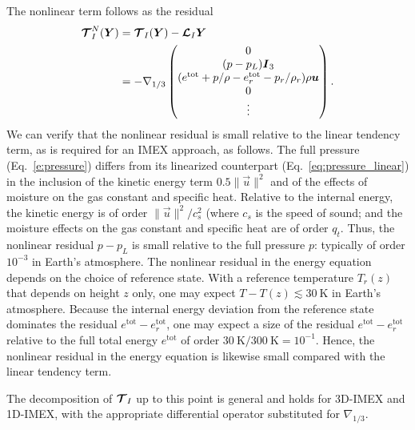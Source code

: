 \documentclass{report}
\begin{document}
The nonlinear term follows as the residual 
\begin{equation}\label{e:nonlinear_residual}
\begin{split}
\boldsymbol{{\mathcal{T}}}^N_{I}(\boldsymbol{{Y}}) & =  \boldsymbol{{\mathcal{T}}}_I(\boldsymbol{{Y}}) - \boldsymbol{{\mathcal{L}}}_I \boldsymbol{{Y}} \\
& = 
-\nabla_{1/3} \begin{pmatrix}
0 \\
(p - p_L) \boldsymbol{{I}}_3\\
(e^{\mathrm{tot}}  + p/\rho - e^{\mathrm{tot}}_r - p_r/\rho_r) \rho \boldsymbol{{u}}\\
0\\
\vdots
\end{pmatrix}.
\end{split}
\end{equation}
We can verify that the nonlinear residual is small relative to the linear tendency term, as is required for an IMEX approach, as follows. The full pressure (Eq.~\ref{e:pressure}) differs from its linearized counterpart (Eq.~\ref{eq:pressure_linear}) in the inclusion of the kinetic energy term $0.5 \|\vec{u} \|^2$ and of the effects of moisture on the gas constant and specific heat. Relative to the internal energy, the kinetic energy is of order $\|\vec{u}\|^2/c_s^2$ (where $c_s$ is the speed of sound; 
and the moisture effects on the gas constant and specific heat are of order $q_t$. Thus, the nonlinear residual $p-p_L$ is small relative to the full pressure $p$: typically of order $10^{-3}$ in Earth's atmosphere. The nonlinear residual in the energy equation depends on the choice of reference state. With a reference temperature $T_r(z)$ that depends on height $z$ only, one may expect $T - T(z) \lesssim 30~\mathrm{K}$ in Earth's atmosphere. Because the internal energy deviation from the reference state dominates the residual $e^{\mathrm{tot}} - e^{\mathrm{tot}}_r$, one may expect a size of the residual $e^{\mathrm{tot}} - e^{\mathrm{tot}}_r$ relative to the full total energy $e^{\mathrm{tot}}$ of order $30~\mathrm{K}/300~\mathrm{K} = 10^{-1}$. Hence, the nonlinear residual in the energy equation is likewise small compared with the linear tendency term. 
 
The decomposition of $\boldsymbol{{\mathcal{T}}}_I$ up to this point is general and holds for 3D-IMEX and 1D-IMEX, with the appropriate differential operator substituted for $\nabla_{1/3}$.






\end{document}
